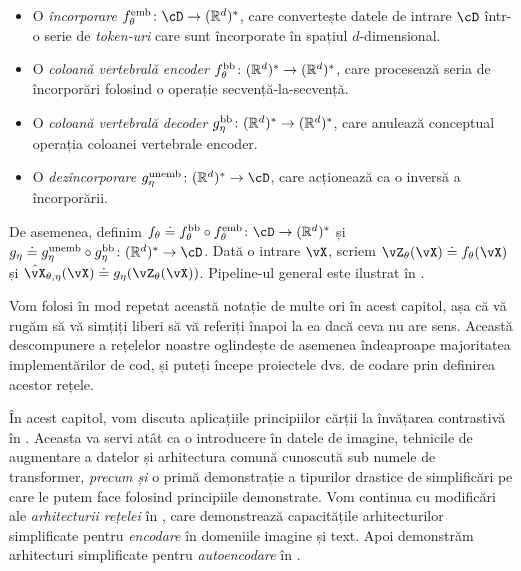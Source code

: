 \documentclass[../../book-main_ro.tex]{subfiles}
\begin{document}
\begin{itemize}
\begin{itemize}
        \item O \textit{încorporare} \(f_{\theta}^{\emb} \colon \cD \to (\R^{d})^{*}\), care convertește datele de intrare \(\cD\) într-o serie de \textit{token-uri} care sunt încorporate în spațiul \(d\)-dimensional.
        \item O \textit{coloană vertebrală encoder} \(f_{\theta}^{\mathrm{bb}} \colon (\mathbb{R}^{d})^{*} \to (\mathbb{R}^{d})^{*}\), care procesează seria de încorporări folosind o operație secvență-la-secvență.
        \item O \textit{coloană vertebrală decoder} \(g_{\eta}^{\mathrm{bb}} \colon (\mathbb{R}^{d})^{*} \to (\mathbb{R}^{d})^{*}\), care anulează conceptual operația coloanei vertebrale encoder.
        \item O \textit{dezîncorporare} \(g_{\eta}^{\unemb} \colon (\R^{d})^{*} \to \cD\), care acționează ca o inversă a încorporării.
    \end{itemize}
    De asemenea, definim \(f_{\theta} \doteq f_{\theta}^{\backbone} \circ f_{\theta}^{\emb} \colon \cD \to (\R^{d})^{*}\) și \(g_{\eta} \doteq g_{\eta}^{\unemb} \circ g_{\eta}^{\backbone} \colon (\R^{d})^{*} \to \cD\). Dată o intrare \(\vX\), scriem \(\vZ_{\theta}(\vX) \doteq f_{\theta}(\vX)\) și \(\hat{\vX}_{\theta, \eta}(\vX) \doteq g_{\eta}(\vZ_{\theta}(\vX))\). Pipeline-ul general este ilustrat în .
\end{itemize}

Vom folosi în mod repetat această notație de multe ori în acest capitol, așa că vă rugăm să vă simțiți liberi să vă referiți înapoi la ea dacă ceva nu are sens. Această descompunere a rețelelor noastre oglindește de asemenea îndeaproape majoritatea implementărilor de cod, și puteți începe proiectele dvs. de codare prin definirea acestor rețele.

În acest capitol, vom discuta aplicațiile principiilor cărții la învățarea contrastivă în . Aceasta va servi atât ca o introducere în datele de imagine, tehnicile de augmentare a datelor și arhitectura comună cunoscută sub numele de transformer, \textit{precum și} o primă demonstrație a tipurilor drastice de simplificări pe care le putem face folosind principiile demonstrate. Vom continua cu modificări ale \textit{arhitecturii rețelei} în , care demonstrează capacitățile arhitecturilor simplificate pentru \textit{encodare} în domeniile imagine și text. Apoi demonstrăm arhitecturi simplificate pentru \textit{autoencodare} în .
\end{document}
